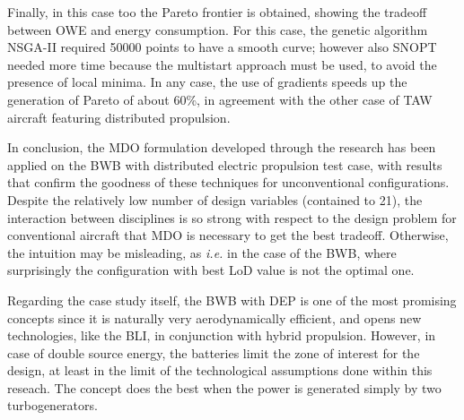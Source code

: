 Finally, in this case too the Pareto frontier is obtained, showing the tradeoff between OWE and energy consumption. 
For this case, the genetic algorithm NSGA-II required 50000 points to have a smooth curve; however also SNOPT needed more time because the multistart approach must be used, to avoid the presence of local minima. 
In any case, the use of gradients speeds up the generation of Pareto of about 60\%, in agreement with the other case of TAW aircraft featuring distributed propulsion. 

In conclusion, the MDO formulation developed through the research has been applied on the BWB with distributed electric propulsion test case, with results that confirm the goodness of these techniques for unconventional configurations. 
Despite the relatively low number of design variables (contained to 21), the interaction between disciplines is so strong with respect to the design problem for conventional aircraft that MDO is necessary to get the best tradeoff. 
Otherwise, the intuition may be misleading, as \textit{i.e.} in the case of the BWB, where surprisingly the configuration with best LoD value is not the optimal one. 

Regarding the case study itself, the BWB with DEP is one of the most promising concepts since it is naturally very aerodynamically efficient, and opens new technologies, like the BLI, in conjunction with hybrid propulsion. 
However, in case of double source energy, the batteries limit the zone of interest for the design, at least in the limit of the technological assumptions done within this reseach. 
The concept does the best when the power is generated simply by two turbogenerators. 

\clearpage

